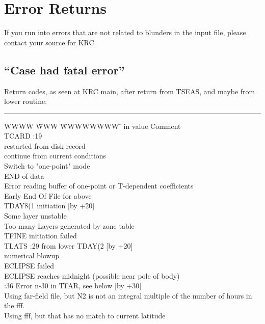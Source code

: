 \documentclass{article}
\begin{document}
\section{Error Returns} %

If you run into errors that are not related to blunders in the input file,
please contact your source for KRC.

\subsection{``Case had fatal error''} %
\begin{table} 
\caption[Return codes]{Return codes, as seen at KRC main, after return from TSEAS, and maybe from lower routine:}
\label{ercode.tab}
\rule[.05in]{7.in}{.01in}
\begin{tabbing} 
WWWW \= WWW \= WWWWWWWW \=   \kill 
in  \>  value\> Comment  \\
TCARD \> :19 \\
    \> restarted from disk record \\
    \> continue from current conditions \\
    \> Switch to "one-point" mode \\
    \> END of data  \\
    \> Error reading buffer of one-point or T-dependent coefficients \\
    \> Early End Of File for above \\
TDAY8(1 \> \> initiation  [by +20] \\
    \> Some layer unstable   \\
    \> Too many Layers generated by zone table \\
    \> TFINE initiation failed  \\
TLATS \> :29 from lower TDAY(2 [by +20] \\
    \> numerical blowup \\
    \> ECLIPSE failed \\
    \> ECLIPSE reaches midnight (possible near pole of body) \\
   :36 \> Error n-30 in TFAR, see below [by +30] \\
    \> Using far-field file, but N2 is not an integral multiple of the number of hours in the fff. \\
    \> Using fff, but that has no match to current latitude \\

\end{tabbing}
\end{table}
\end{document}
